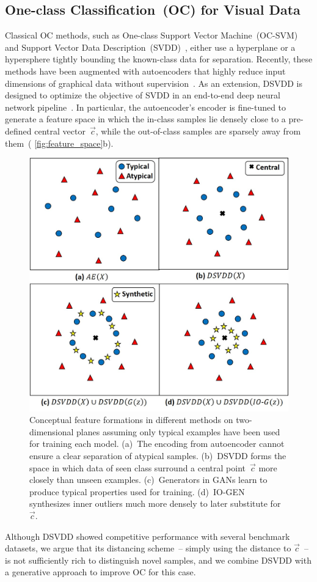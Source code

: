 \documentclass[letterpaper]{article} %
\let\orgautoref\autoref
\renewcommand{\autoref}
{\def\equationautorefname{Equation}%
	\def\figureautorefname{Fig.}%
	\def\subfigureautorefname{Fig.}%
	\def\Itemautorefname{item}%
	\def\tableautorefname{Table}%
	\def\exerciseautorefname{Exercise}%
	\def\starexerciseautorefname{Exercise}%
	\def\sectionautorefname{Section}%
	\def\subsectionautorefname{Section}%
	\def\subsubsectionautorefname{Section}%
	\def\chapterautorefname{Section}%
	\def\partautorefname{Part}%
	\orgautoref}
\begin{document}
\subsection{One-class Classification~(OC) for Visual Data}
\label{sec:occ}

Classical OC methods, such as One-class Support Vector
Machine~(OC-SVM)~\citep{SPSSW01} and Support Vector Data
Description~(SVDD)~\citep{TD04}, either use a hyperplane or a
hypersphere tightly bounding the known-class data for separation.
Recently, these methods have been augmented with autoencoders that
highly reduce input dimensions of graphical data without
supervision~\citep{XRYSS15, RGLL20}. As an extension, DSVDD is designed
to optimize the objective of SVDD in an end-to-end deep neural network
pipeline~\citep{RVGDSBMK18}. In particular, the autoencoder's encoder is
fine-tuned to generate a feature space in which the in-class
samples lie densely close to a pre-defined central vector~$\vec{c}$,
while the out-of-class samples are sparsely away from
them~(\autoref{fig:feature_space}b).
%
\begin{figure}\centering
	\includegraphics[width=.7\linewidth]{feature_space}
	\caption{
        Conceptual feature formations in different methods on
        two-dimensional planes assuming only typical examples have been
        used for training each model.
        (a)~The encoding from autoencoder cannot ensure a clear
        separation of atypical samples.
        (b)~DSVDD forms the space in which data of seen class surround a
        central point~$\vec{c}$ more closely than unseen examples.
        (c)~Generators in GANs learn to produce typical properties used
        for training.
        (d)~\mbox{IO-GEN} synthesizes inner outliers much more densely to later
        substitute for~$\vec{c}$.
	}
	\label{fig:feature_space}
\end{figure}
%
Although DSVDD showed competitive performance with several benchmark
datasets, we argue that its distancing scheme~-- simply using the
distance to $\vec{c}$~-- is not sufficiently rich to distinguish novel
samples, and we combine DSVDD with a generative approach to improve OC
for this case.
\end{document}
